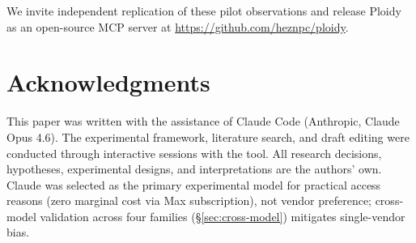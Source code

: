 \documentclass[11pt]{article}
\begin{document}
We invite independent replication of these pilot observations and release Ploidy as an open-source MCP server at \url{https://github.com/heznpc/ploidy}.

\section*{Acknowledgments}

This paper was written with the assistance of Claude Code (Anthropic, Claude Opus 4.6). The experimental framework, literature search, and draft editing were conducted through interactive sessions with the tool. All research decisions, hypotheses, experimental designs, and interpretations are the authors' own. Claude was selected as the primary experimental model for practical access reasons (zero marginal cost via Max subscription), not vendor preference; cross-model validation across four families (\S\ref{sec:cross-model}) mitigates single-vendor bias.


\end{document}
